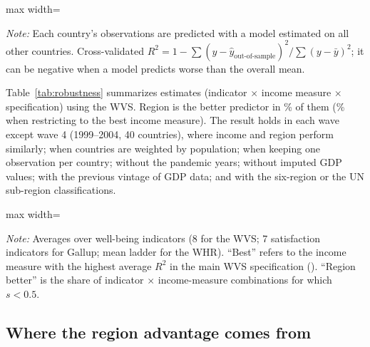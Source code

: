 \begin{table}[htbp]
    \centering
    \caption{Out-of-sample predictive capacity: leave-one-country-out cross-validated $R^2$}\label{tab:cv}
    \begin{adjustbox}{max width=\textwidth}
    
    \end{adjustbox}
    \begin{minipage}{\textwidth}\footnotesize \textit{Note:} Each country's observations are predicted with a model estimated on all other countries. Cross-validated $R^2 = 1 - \sum (y - \hat y_{\text{out-of-sample}})^2 / \sum (y - \bar y)^2$; it can be negative when a model predicts worse than the overall mean.\end{minipage}
\end{table}

Table~\ref{tab:robustness} summarizes \nSpecsWVS estimates (indicator $\times$ income measure $\times$ specification) using the WVS. Region is the better predictor in \shareRegionBetterWVS\% of them (\shareRegionBetterWVSbest\% when restricting to the best income measure). The result holds in each wave except wave 4 (1999--2004, 40 countries), where income and region perform similarly; when countries are weighted by population; when keeping one observation per country; without the pandemic years; without imputed GDP values; with the previous vintage of GDP data; and with the six-region or the UN sub-region classifications.

\begin{table}[htbp]
    \centering
    \caption{Robustness: income vs.\ region across specifications and datasets}\label{tab:robustness}
    \begin{adjustbox}{max width=\textwidth}
    
    \end{adjustbox}
    \begin{minipage}{\textwidth}\footnotesize \textit{Note:} Averages over well-being indicators (8 for the WVS; 7 satisfaction indicators for Gallup; mean ladder for the WHR). ``Best'' refers to the income measure with the highest average $R^2$ in the main WVS specification (\bestIncome). ``Region better'' is the share of indicator $\times$ income-measure combinations for which $s < 0.5$.\end{minipage}
\end{table}

\subsection{Where the region advantage comes from}\label{subsec:region_limits}

